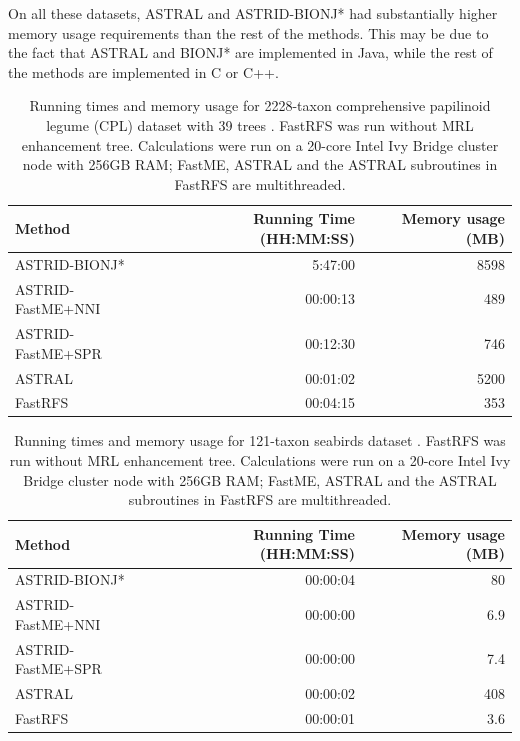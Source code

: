 On all these datasets, ASTRAL and ASTRID-BIONJ* had substantially higher memory usage requirements than the rest of the methods. This may be due to the fact that ASTRAL and BIONJ* are implemented in Java, while the rest of the methods are implemented in C or C++. 

\begin{table}[hbt!]
    \centering
\begin{tabular}{l|rr}
     Method & Running Time (HH:MM:SS) & Memory usage (MB)\\
    \hline
     ASTRID-BIONJ* & 5:47:00 & 8598 \\
     ASTRID-FastME+NNI & 00:00:13 & 489 \\
     ASTRID-FastME+SPR & 00:12:30 & 746 \\
     ASTRAL & 00:01:02 & 5200 \\
     FastRFS & 00:04:15 & 353 \\
\end{tabular}
\caption[Running times and memory usage for 2228-taxon comprehensive papilinoid legume (CPL) dataset]{Running times and memory usage for 2228-taxon comprehensive papilinoid legume (CPL) dataset with 39 trees \cite{wojciechowski2000molecular}. FastRFS was run without MRL enhancement tree. Calculations were run on a 20-core Intel Ivy Bridge cluster node with 256GB RAM; FastME, ASTRAL and the ASTRAL subroutines in FastRFS are multithreaded.}
\label{astrid-missing::tab:cpl-runningtime}
\end{table}

\begin{table}[hbt!]
    \centering
\begin{tabular}{l|rr}
     Method & Running Time  (HH:MM:SS) & Memory usage (MB)\\
    \hline
     ASTRID-BIONJ* & 00:00:04 & 80 \\
     ASTRID-FastME+NNI & 00:00:00 & 6.9 \\
     ASTRID-FastME+SPR & 00:00:00 & 7.4 \\
     ASTRAL & 00:00:02 & 408 \\
     FastRFS & 00:00:01 & 3.6 \\
\end{tabular}
\caption[Running times and memory usage for 121-taxon seabirds dataset]{Running times and memory usage for 121-taxon seabirds dataset \cite{kennedy2002seabird}. FastRFS was run without MRL enhancement tree. Calculations were run on a 20-core Intel Ivy Bridge cluster node with 256GB RAM; FastME, ASTRAL and the ASTRAL subroutines in FastRFS are multithreaded.}
\label{astrid-missing::tab:seabirds-runningtime}
\end{table}


